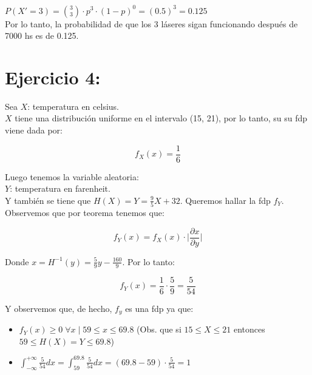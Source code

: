 \documentclass[11pt]{article}
\begin{document}
$ P(X' = 3) = \binom{3}{3} \cdot p^3 \cdot (1 - p)^0 = (0.5)^3 = 0.125 $ \\

Por lo tanto, la probabilidad de que los 3 láseres sigan funcionando después de 
7000 hs es de 0.125. 

\newpage

\section*{Ejercicio 4:}

Sea $ X$: temperatura en celsius. \\

$ X $ tiene una distribución uniforme en el intervalo (15, 21), por lo tanto, su
su fdp viene dada por: 

\begin{equation*}
  f_X(x) = \frac{1}{6}
\end{equation*}

Luego tenemos la variable aleatoria: \\

$Y$: temperatura en farenheit. \\

Y también se tiene que $ H(X) = Y = \frac{9}{5}X + 32 $. Queremos hallar la fdp $f_Y$. \\

Observemos que por teorema tenemos que:

\begin{equation*}
  f_Y(x) = f_X(x) \cdot \Big|\frac{\partial x}{\partial y}\Big|
\end{equation*}

Donde $ x = H^{-1}(y) = \frac{5}{9}y - \frac{160}{9} $. Por lo tanto:

\begin{equation*}
  f_Y(x) = \frac{1}{6} \cdot \frac{5}{9} = \frac{5}{54}
\end{equation*}

Y observemos que, de hecho, $f_y$ es una fdp ya que:

\begin{itemize}
  \item $f_Y(x) \geq 0 \; \forall x \; | \; 59 \leq x \leq 69.8 $ (Obs. que si $15 \leq X \leq 21 $ entonces $59 \leq H(X) = Y \leq 69.8$)
  \item $ \int_{-\infty}^{+\infty} \frac{5}{54} dx =  
                  \int_{59}^{69.8} \frac{5}{54} dx = 
                  (69.8 - 59) \cdot \frac{5}{54}   = 1 $
\end{itemize}
\end{document}
